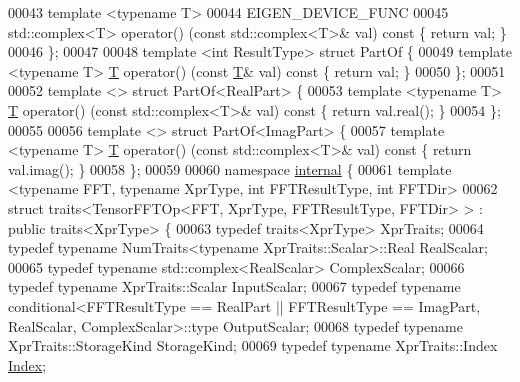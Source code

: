 \begin{DoxyCode}
00043   \textcolor{keyword}{template} <\textcolor{keyword}{typename} T>
00044   EIGEN\_DEVICE\_FUNC
00045   std::complex<T> operator() (\textcolor{keyword}{const} std::complex<T>& val)\textcolor{keyword}{ const }\{ \textcolor{keywordflow}{return} val; \}
00046 \};
00047 
00048 \textcolor{keyword}{template} <\textcolor{keywordtype}{int} ResultType> \textcolor{keyword}{struct }PartOf \{
00049   \textcolor{keyword}{template} <\textcolor{keyword}{typename} T> \hyperlink{group___sparse_core___module_class_eigen_1_1_triplet}{T} operator() (\textcolor{keyword}{const} \hyperlink{group___sparse_core___module_class_eigen_1_1_triplet}{T}& val)\textcolor{keyword}{ const }\{ \textcolor{keywordflow}{return} val; \}
00050 \};
00051 
00052 \textcolor{keyword}{template} <> \textcolor{keyword}{struct }PartOf<RealPart> \{
00053   \textcolor{keyword}{template} <\textcolor{keyword}{typename} T> \hyperlink{group___sparse_core___module_class_eigen_1_1_triplet}{T} operator() (\textcolor{keyword}{const} std::complex<T>& val)\textcolor{keyword}{ const }\{ \textcolor{keywordflow}{return} val.real(); \}
00054 \};
00055 
00056 \textcolor{keyword}{template} <> \textcolor{keyword}{struct }PartOf<ImagPart> \{
00057   \textcolor{keyword}{template} <\textcolor{keyword}{typename} T> \hyperlink{group___sparse_core___module_class_eigen_1_1_triplet}{T} operator() (\textcolor{keyword}{const} std::complex<T>& val)\textcolor{keyword}{ const }\{ \textcolor{keywordflow}{return} val.imag(); \}
00058 \};
00059 
00060 \textcolor{keyword}{namespace }\hyperlink{namespaceinternal}{internal} \{
00061 \textcolor{keyword}{template} <\textcolor{keyword}{typename} FFT, \textcolor{keyword}{typename} XprType, \textcolor{keywordtype}{int} FFTResultType, \textcolor{keywordtype}{int} FFTDir>
00062 \textcolor{keyword}{struct }traits<TensorFFTOp<FFT, XprType, FFTResultType, FFTDir> > : \textcolor{keyword}{public} traits<XprType> \{
00063   \textcolor{keyword}{typedef} traits<XprType> XprTraits;
00064   \textcolor{keyword}{typedef} \textcolor{keyword}{typename} NumTraits<typename XprTraits::Scalar>::Real RealScalar;
00065   \textcolor{keyword}{typedef} \textcolor{keyword}{typename} std::complex<RealScalar> ComplexScalar;
00066   \textcolor{keyword}{typedef} \textcolor{keyword}{typename} XprTraits::Scalar InputScalar;
00067   \textcolor{keyword}{typedef} \textcolor{keyword}{typename} conditional<FFTResultType == RealPart || FFTResultType == ImagPart, RealScalar,
       ComplexScalar>::type OutputScalar;
00068   \textcolor{keyword}{typedef} \textcolor{keyword}{typename} XprTraits::StorageKind StorageKind;
00069   \textcolor{keyword}{typedef} \textcolor{keyword}{typename} XprTraits::Index \hyperlink{namespace_eigen_a62e77e0933482dafde8fe197d9a2cfde}{Index};

\end{DoxyCode}
